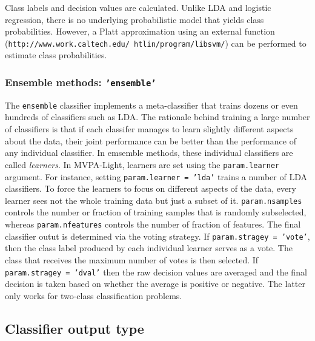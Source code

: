 \documentclass[utf8]{frontiersSCNS} %
\newcommand{\mvpa}{MVPA-Light}
\newcommand{\ttt}[1]{\texttt{#1}}
\begin{document}
Class labels and decision values are calculated. Unlike LDA and logistic regression,
there is no underlying probabilistic model that yields class probabilities.
However, a Platt approximation using an external function (\ttt{http://www.work.caltech.edu/~htlin/program/libsvm/}) can be performed to estimate
class probabilities.


\subsubsection{Ensemble methods: \ttt{'ensemble'}}

The \ttt{ensemble} classifier implements a meta-classifier that trains dozens
or even hundreds of classifiers such as LDA. The rationale behind training a large number of classifiers is that if each classifer manages to learn slightly different aspects about the data, their joint performance can be better than the performance of any individual classifier.
In emsemble methods, these individual classifiers are called \textit{learners}. In \mvpa{}, learners are set using the \ttt{param.learner} argument. For instance, setting \ttt{param.learner = 'lda'} trains a number of LDA classifiers. To force the learners to focus on different aspects of the data, every learner sees not the whole training data but just a subset of it. \ttt{param.nsamples} controls the number or fraction of training samples that is randomly subselected, whereas \ttt{param.nfeatures} controls the number of fraction of features.
The final classifier outut is determined via the voting strategy. If \ttt{param.stragey = 'vote'}, then the class label produced by each individual learner serves as a vote. The class that receives the maximum number of votes is then selected. If \ttt{param.stragey = 'dval'}  then the raw decision values are averaged and the final decision is taken based on whether the average is positive or negative. The latter only works for two-class classification problems.

\subsection{Classifier output type}\label{sec:output}
\end{document}
